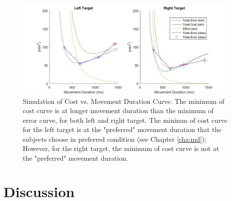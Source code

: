 \begin{figure}
	\centering
	\includegraphics[width=\linewidth]{"figures/variability - cost - minimum shift"}
	\caption[Simulation of Cost vs. Movement Duration Curve]{Simulation of Cost vs. Movement Duration Curve. The minimum of cost curve is at longer movement duration than the minimum of error curve, for both left and right target. The minimm of cost curve for the left target is at the "preferred" movement duration that the subjects choose in preferred condition (see Chapter \ref{cha:md}); However, for the right target, the minimum of cost curve is not at the "preferred" movement duration.}
	\label{fig:variability---cost---minimum-shift}
\end{figure}


\section{Discussion}

